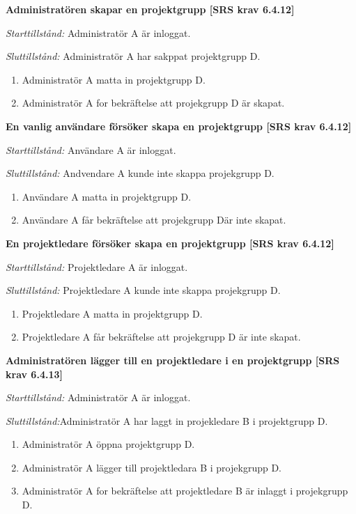 \documentclass[a4paper]{article}
\begin{document}
\begin{FT}
\item %
\textbf{Administratören skapar en projektgrupp [SRS krav 6.4.12]}

\emph{Starttillstånd:} Administratör A är inloggat.

\emph{Sluttillstånd:} Administratör A har sakppat projektgrupp D.

\begin{enumerate}
\item Administratör A matta in projektgrupp D.
\item Administratör A for bekräftelse att projekgrupp D är skapat.
\end{enumerate}

\item %
\textbf{En vanlig användare försöker skapa en projektgrupp [SRS krav 6.4.12]}

\emph{Starttillstånd:} Användare A är inloggat.

\emph{Sluttillstånd:} Andvendare A kunde inte skappa projekgrupp D.

\begin{enumerate}
\item Användare A matta in projektgrupp D.
\item Användare A får bekräftelse att projekgrupp Där inte skapat.
\end{enumerate}

\item %
\textbf{En projektledare försöker skapa en projektgrupp [SRS krav 6.4.12]}

\emph{Starttillstånd:} Projektledare A är inloggat.

\emph{Sluttillstånd:} Projektledare A kunde inte skappa projekgrupp D.

\begin{enumerate}
\item Projektledare A matta in projektgrupp D.
\item Projektledare A får bekräftelse att projekgrupp D är inte skapat.
\end{enumerate}

\item %
\textbf{Administratören lägger till en projektledare i en projektgrupp [SRS krav 6.4.13]}

\emph{Starttillstånd:} Administratör A är inloggat.

\emph{Sluttillstånd:}Administratör A har laggt in projekledare B i projektgrupp D.

\begin{enumerate}
\item Administratör A öppna projektgrupp D.
\item Administratör A lägger till projektledara B i projekgrupp D.
\item Administratör A for bekräftelse att projektledare B är inlaggt  i  projekgrupp D.
\end{enumerate}


\end{FT}
\end{document}
